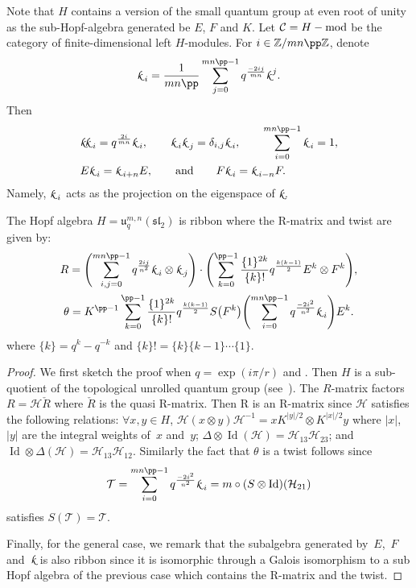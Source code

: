 \documentclass[pdftex]{sigma}
\numberwithin{equation}{section}
\newcommand{\smk}{{\fontfamily{pzc}\selectfont \text{k}}}
\numberwithin{theorem}{section}
\numberwithin{proposition}{section}
\numberwithin{definition}{section}
\numberwithin{lemma}{section}
\numberwithin{corollary}{section}
\numberwithin{remark}{section}
\numberwithin{example}{section}
\newcommand{\cat}{\mathcal{C}}
\newcommand{\Z}{\ensuremath{\mathbb{Z}}}
\newcommand{\Id}{\operatorname{Id}}
\begin{document}
 Note that $H$ contains a version of the small quantum group at even
 root of unity as the sub-Hopf-algebra generated be $E$, $F$ and $K$.
 Let
$\cat=H-{\rm mod}$
 be the
 category of finite-dimensional left
 $H$-modules.
\noindent
For $i\in\Z/mn{\pp}\Z$, denote
\[
\smk_{\; i} = \frac{1}{mn{\pp}}\sum_{j=0}^{mn{\pp}-1} q^{\frac{-2ij}{mn}}\smk^{\, j}.
\]
Then
\begin{align*}
&\smk\smk_{\; i} = q^{\frac{2i}{mn}}\smk_{\; i},\qquad \smk_{\; i}\smk_{\; j}=\delta_{i,j}\smk_{\; i}, \qquad \sum_{i=0}^{mn{\pp}-1} \smk_{\; i}=1, \\
&E\smk_{\; i}=\smk_{\; i+n}E, \qquad\text{and}\qquad F\smk_{\; i}=\smk_{\; i-n}F.
\end{align*}
Namely, $\smk_{\; i}$ acts as the projection on the  eigenspace of $\smk$.
\begin{proposition}
 The Hopf algebra $H=\mathfrak{u}^{m,n}_{q}(\mathfrak{sl}_2)$ is
 ribbon where the R-matrix and twist are given by:
 \begin{gather*}
 R=\Biggl(\sum_{i,j=0}^{mn{\pp}-1}
 q^{\frac{2ij}{n^2}}\smk_{\; i}\otimes
 \smk_{\; j}\Biggr)\cdot\Biggl(\sum_{k=0}^{{\pp}-1}
 \frac{\{1\}^{2k}}{\{k\}!}q^\frac{k(k-1)}{2} E^k\otimes
 F^k\Biggr),
 \\
 \theta=K^{{\pp}-1}\sum_{k=0}^{{\pp}-1}
 \frac{\{1\}^{2k}}{\{k\}!}q^\frac{k(k-1)}{2}
 S\bigl(F^k\bigr)\Biggl(\sum_{i=0}^{mn{\pp}-1}
 q^{\frac{-2i^2}{n^2}}\smk_{\; i}\Biggr) E^k.
 \end{gather*}
 where $\{k\} = q^k-q^{-k}$ and $\{k\}! = \{k\} \{k-1\} \cdots \{1\}$.
\end{proposition}
\begin{proof} We first sketch the proof when $q=\exp(i\pi/r)$ and
 . Then $H$ is a sub-quotient of the
 topological unrolled quantum group (see~\cite{GHP22}). The
 $R$-matrix factors $R=\mathcal H\check R$ where $\check R$ is the
 quasi R-matrix. Then R is an R-matrix since $\mathcal H$ satisfies
 the following relations: $\forall x,y\in H$,
 $\mathcal H(x\otimes y)\mathcal H^{-1}=xK^{|y|/2}\otimes K^{|x|/2}y$
 where $|x|$, $|y|$ are the integral weights of~$x$ and~$y$;
 $\Delta\otimes\Id(\mathcal H)=\mathcal H_{13}\mathcal H_{23}$; and
 $\Id\otimes\Delta(\mathcal H)=\mathcal H_{13}\mathcal H_{12}$.
 Similarly the fact that $\theta$ is a twist follows since
\[
\mathcal T=\sum_{i=0}^{mn{\pp}-1}
 q^{\frac{-2i^2}{n^2}}\smk_{\; i}=m\circ(S\otimes\Id)(\mathcal H_{21})
\]
 satisfies $S(\mathcal T)=\mathcal T$.

 Finally, for the general case, we remark that the
  subalgebra generated by~$E$,~$F$ and~$\smk$ is
 also ribbon since it is isomorphic through a Galois isomorphism to a
 sub Hopf algebra of the previous case which contains the R-matrix
 and the twist.
\end{proof}
\end{document}
